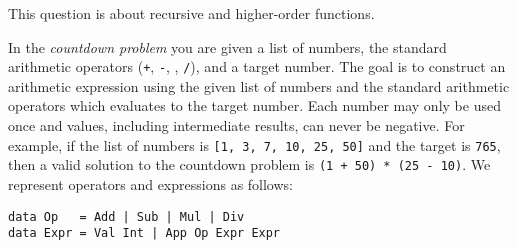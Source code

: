 \question This question is about recursive and higher-order functions.


In the \emph{countdown problem} you are given a list of numbers, the standard arithmetic operators (\texttt{\small +}, \texttt{\small -}, \texttt{\small *}, \texttt{\small /}), and a target number. The goal is to construct an arithmetic expression using the given list of numbers and the standard arithmetic operators which evaluates to the target number. Each number may only be used once and values, including intermediate results, can never be negative. For example, if the list of numbers is \texttt{\small [1, 3, 7, 10, 25, 50]} and the target is \texttt{\small 765}, then a valid solution to the countdown problem is \texttt{\small (1 + 50) * (25 - 10)}. We represent operators and expressions as follows:
\begin{verbatim}
data Op   = Add | Sub | Mul | Div
data Expr = Val Int | App Op Expr Expr
\end{verbatim}

